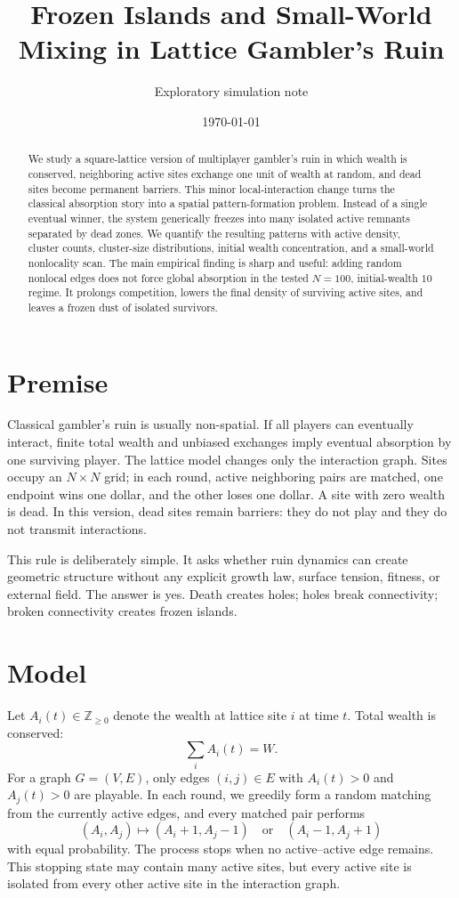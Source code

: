 \documentclass[11pt]{article}
\title{Frozen Islands and Small-World Mixing in Lattice Gambler's Ruin}
\author{Exploratory simulation note}
\date{\today}
\begin{document}
\maketitle

\begin{abstract}
We study a square-lattice version of multiplayer gambler's ruin in which wealth is conserved, neighboring active sites exchange one unit of wealth at random, and dead sites become permanent barriers. This minor local-interaction change turns the classical absorption story into a spatial pattern-formation problem. Instead of a single eventual winner, the system generically freezes into many isolated active remnants separated by dead zones. We quantify the resulting patterns with active density, cluster counts, cluster-size distributions, initial wealth concentration, and a small-world nonlocality scan. The main empirical finding is sharp and useful: adding random nonlocal edges does not force global absorption in the tested $N=100$, initial-wealth $10$ regime. It prolongs competition, lowers the final density of surviving active sites, and leaves a frozen dust of isolated survivors.
\end{abstract}

\section{Premise}

Classical gambler's ruin is usually non-spatial. If all players can eventually interact, finite total wealth and unbiased exchanges imply eventual absorption by one surviving player. The lattice model changes only the interaction graph. Sites occupy an $N \times N$ grid; in each round, active neighboring pairs are matched, one endpoint wins one dollar, and the other loses one dollar. A site with zero wealth is dead. In this version, dead sites remain barriers: they do not play and they do not transmit interactions.

This rule is deliberately simple. It asks whether ruin dynamics can create geometric structure without any explicit growth law, surface tension, fitness, or external field. The answer is yes. Death creates holes; holes break connectivity; broken connectivity creates frozen islands.

\section{Model}

Let $A_i(t) \in \mathbb{Z}_{\ge 0}$ denote the wealth at lattice site $i$ at time $t$. Total wealth is conserved:
\[
  \sum_i A_i(t) = W.
\]
For a graph $G=(V,E)$, only edges $(i,j)\in E$ with $A_i(t)>0$ and $A_j(t)>0$ are playable. In each round, we greedily form a random matching from the currently active edges, and every matched pair performs
\[
  (A_i,A_j) \mapsto (A_i+1,A_j-1)
  \quad\text{or}\quad
  (A_i-1,A_j+1)
\]
with equal probability. The process stops when no active--active edge remains. This stopping state may contain many active sites, but every active site is isolated from every other active site in the interaction graph.
\end{document}
